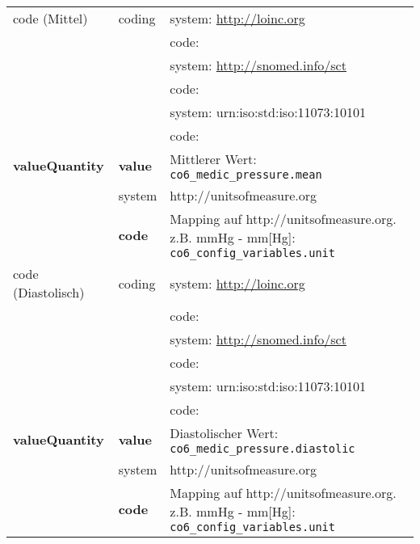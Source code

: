 \begin{longtable}{|l|l|p{7cm}|}
	code (Mittel) & coding & system: \url{http://loinc.org} \\ 
	\cline{3-3} 
	&  & code:  \\ 
	\cline{3-3} 
	&  & system: \url{http://snomed.info/sct} \\ 
	\cline{3-3}
	&  & code:  \\ 
	\cline{3-3} 
	&  & system: urn:iso:std:iso:11073:10101 \\ 
	\cline{3-3}
	&  & code:  \\ \hline	
	\textbf{valueQuantity} & \textbf{value} & Mittlerer Wert: \texttt{co6\_medic\_pressure.mean} \\
	\cline{2-3}
	& system & http://unitsofmeasure.org \\ 
	\cline{2-3}
	& \textbf{code} & Mapping auf http://unitsofmeasure.org. z.B. mmHg - mm[Hg]: \texttt{co6\_config\_variables.unit} \\ \hline
	code (Diastolisch) & coding & system: \url{http://loinc.org} \\ 
	\cline{3-3} 
	&  & code:  \\ 
	\cline{3-3} 
	&  & system: \url{http://snomed.info/sct} \\ 
	\cline{3-3}
	&  & code:  \\ 
	\cline{3-3} 
	&  & system: urn:iso:std:iso:11073:10101 \\ 
	\cline{3-3}
	&  & code:  \\ \hline	
	\textbf{valueQuantity} & \textbf{value} & Diastolischer Wert: \texttt{co6\_medic\_pressure.diastolic} \\
	\cline{2-3}
	& system & http://unitsofmeasure.org \\ 
	\cline{2-3}
	& \textbf{code} & Mapping auf http://unitsofmeasure.org. z.B. mmHg - mm[Hg]: \texttt{co6\_config\_variables.unit} \\ \hline
\end{longtable}
\clearpage
